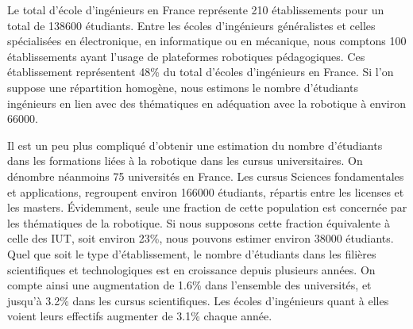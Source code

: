 \documentclass[a4paper,12pt]{report}
\begin{document}
Le total d'école d'ingénieurs en France représente 210 établissements pour un total de 138600 étudiants.
Entre les écoles d'ingénieurs généralistes et celles spécialisées en électronique, en informatique ou en mécanique, nous comptons 100 établissements ayant l'usage de plateformes robotiques pédagogiques.
Ces établissement représentent 48\% du total d'écoles d'ingénieurs en France. Si l'on suppose une répartition homogène, nous estimons le nombre d'étudiants ingénieurs en lien avec des thématiques en adéquation avec la robotique à environ 66000.

Il est un peu plus compliqué d'obtenir une estimation du nombre d'étudiants dans les formations liées à la robotique dans les cursus universitaires.
On dénombre néanmoins 75 universités en France.
Les cursus \og{}Sciences fondamentales et applications\fg{}, regroupent environ 166000 étudiants, répartis entre les licenses et les masters.
Évidemment, seule une fraction de cette population est concernée par les thématiques de la robotique.
Si nous supposons cette fraction équivalente à celle des IUT, soit environ 23\%, nous pouvons estimer environ 38000 étudiants.\\

Quel que soit le type d'établissement, le nombre d'étudiants dans les filières scientifiques et technologiques est en croissance depuis plusieurs années.
On compte ainsi une augmentation de 1.6\% dans l'ensemble des universités, et jusqu'à 3.2\% dans les cursus scientifiques.
Les écoles d'ingénieurs quant à elles voient leurs effectifs augmenter de 3.1\% chaque année.

\end{document}
